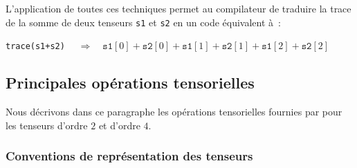\documentclass[rectoverso,pleiades,pstricks,leqno,anti]{texmf/note_technique_2010}
\newcommand{\tfel}[1]{\index{tfel}{#1}{\texttt{#1}}}
\begin{document}
\begin{itemize}
  \begin{center}
    \begin{minipage}{0.8\textwidth}
      \mbox{}\\
      \hlstd{}\hlsym{$<$}\hlstd{}\hlsym{$>$}\hspace*{\fill}\\
      \hlsym{::}\hlsym{::}\hlsym{$<$}\hspace*{\fill}\\
      \hlstd{}\hlstd{\ \ }\hlsym{::}\hlsym{::}\hlsym{$<$}\hlsym{,}\hlsym{$>$::}\hlsym{,}\hspace*{\fill}\\
      \hlstd{}\hlstd{\ \ }\hlsym{$<$}\hlsym{$>$::}\hspace*{\fill}\\
      \hlsym{$>$::}\hspace*{\fill}\\
      \hlstd{}\hlsym{(}\hlstd{}\hlsym{\&);}\\
    \end{minipage}
  \end{center}

\end{itemize}

L'application de toutes ces techniques permet au compilateur de
traduire la trace de la somme de deux tenseurs \texttt{s1} et
\texttt{s2} en un code équivalent à~:
\begin{center}
  \texttt{trace(s1+s2)}
  \(\quad\Rightarrow\quad
  \texttt{s1}[0] + \texttt{s2}[0] +
  \texttt{s1}[1] + \texttt{s2}[1] +
  \texttt{s1}[2] + \texttt{s2}[2]
  \)
\end{center}
  
\subsection{Principales opérations tensorielles}

Nous décrivons dans ce paragraphe les opérations tensorielles fournies
par \tfel{} pour les tenseurs d'ordre \(2\) et d'ordre \(4\).

\subsubsection{Conventions de représentation des tenseurs}
\end{document}
